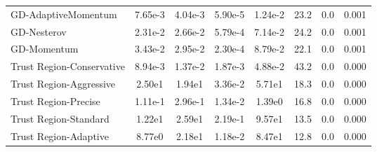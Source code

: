 \documentclass{article}
\begin{document}
\begin{table}[htbp]
{\begin{tabular}{p{2.5cm}*{7}{c}}
GD-AdaptiveMomentum & 7.65e-3 & 4.04e-3 & 5.90e-5 & 1.24e-2 & 23.2 & 0.0 & 0.001 \\
GD-Nesterov & 2.31e-2 & 2.66e-2 & 5.79e-4 & 7.14e-2 & 24.2 & 0.0 & 0.001 \\
GD-Momentum & 3.43e-2 & 2.95e-2 & 2.30e-4 & 8.79e-2 & 22.1 & 0.0 & 0.001 \\
Trust Region-Conservative & 8.94e-3 & 1.37e-2 & 1.87e-3 & 4.88e-2 & 43.2 & 0.0 & 0.000 \\
Trust Region-Aggressive & 2.50e1 & 1.94e1 & 3.36e-2 & 5.71e1 & 18.3 & 0.0 & 0.000 \\
Trust Region-Precise & 1.11e-1 & 2.96e-1 & 1.34e-2 & 1.39e0 & 16.8 & 0.0 & 0.000 \\
Trust Region-Standard & 1.22e1 & 2.59e1 & 2.19e-1 & 9.57e1 & 13.5 & 0.0 & 0.000 \\
Trust Region-Adaptive & 8.77e0 & 2.18e1 & 1.18e-2 & 8.47e1 & 12.8 & 0.0 & 0.000 \\
\bottomrule
\end{tabular}
}
\end{table}
\end{document}
